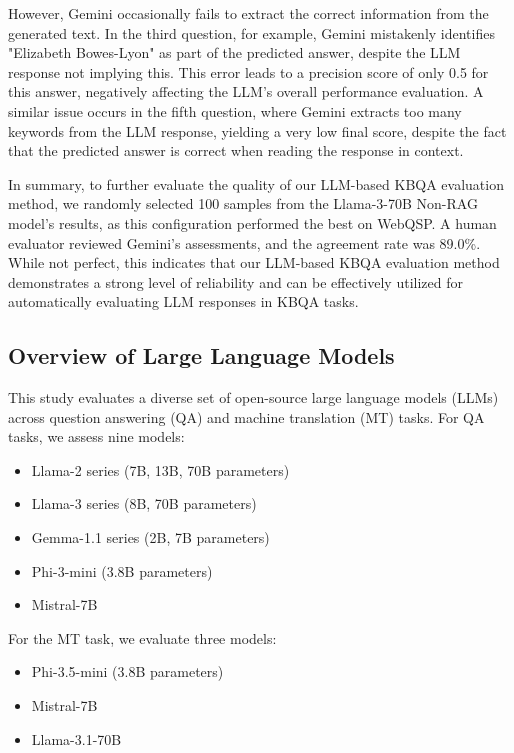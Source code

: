 However, Gemini occasionally fails to extract the correct information from the generated text. In the third question, for example, Gemini mistakenly identifies "Elizabeth Bowes-Lyon" as part of the predicted answer, despite the LLM response not implying this. This error leads to a precision score of only 0.5 for this answer, negatively affecting the LLM's overall performance evaluation. A similar issue occurs in the fifth question, where Gemini extracts too many keywords from the LLM response, yielding a very low final score, despite the fact that the predicted answer is correct when reading the response in context.

In summary, to further evaluate the quality of our LLM-based KBQA evaluation method, we randomly selected 100 samples from the Llama-3-70B Non-RAG model’s results, as this configuration performed the best on WebQSP. A human evaluator reviewed Gemini's assessments, and the agreement rate was 89.0\%. While not perfect, this indicates that our LLM-based KBQA evaluation method demonstrates a strong level of reliability and can be effectively utilized for automatically evaluating LLM responses in KBQA tasks.

\iffalse
\subsection{Overview of Large Language Models}
\label{subsec:overview_llms}

This study evaluates a diverse set of open-source large language models (LLMs) across question answering (QA) and machine translation (MT) tasks. For QA tasks, we assess nine models:

\begin{itemize}
    \item Llama-2 series (7B, 13B, 70B parameters)
    \item Llama-3 series (8B, 70B parameters)
    \item Gemma-1.1 series (2B, 7B parameters)
    \item Phi-3-mini (3.8B parameters)
    \item Mistral-7B
\end{itemize}

For the MT task, we evaluate three models:

\begin{itemize}
    \item Phi-3.5-mini (3.8B parameters)
    \item Mistral-7B
    \item Llama-3.1-70B
\end{itemize}

